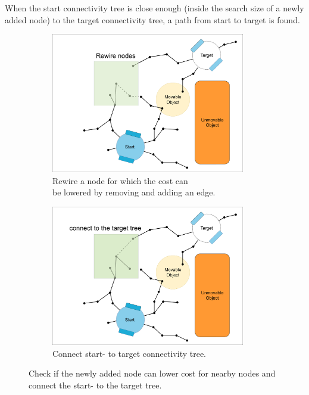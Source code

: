 When the start connectivity tree is close enough (inside the search size of a newly added node) to the target connectivity tree, a path from start to target is found.

\begin{figure}[H]
    \centering
    \begin{subfigure}{.49\textwidth}
    \centering
    \includegraphics[width=0.93\textwidth, cfbox=my_green 5pt 0pt]{figures/required_background/mp/5mp_rewire.drawio.png}
    \caption{Rewire a node for which the cost can\\be lowered by removing and adding an edge.}%
    \label{subfig:mp_rewire}
    \end{subfigure}
    \begin{subfigure}{.49\textwidth}
    \centering
    \includegraphics[width=0.93\textwidth, cfbox=my_green 5pt 0pt]{figures/required_background/mp/6mp_search_other_tree.drawio.png}
    \caption{Connect start- to target connectivity tree.\bs}
    \end{subfigure}
    \caption{Check if the newly added node can lower cost for nearby nodes and connect the start- to the target tree.}
    \label{fig:motion_planner_adding_one_node_tree}
\end{figure}

